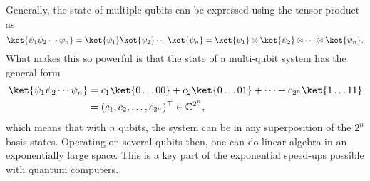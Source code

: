 Generally, the state of multiple qubits can be expressed using the tensor product as
\begin{equation}
    \ket{\psi_1 \psi_2 \cdots  \psi_n}
    = \ket{\psi_1} \ket{\psi_2} \cdots \ket{\psi_n}
    = \ket{\psi_1} \otimes \ket{\psi_2} \otimes \cdots \otimes \ket{\psi_n}
    \label{eq:tensor}.
\end{equation}
What makes this so powerful is that the state of a multi-qubit system has the general form
\begin{equation}
    \begin{aligned}
        \ket{\psi_1 \psi_2 \cdots  \psi_n}
         & = c_1 \ket{0\dots 00} + c_2 \ket{0\dots 01} + \cdots + c_{2^n} \ket{1\dots 11} \\
         & = (c_1, c_2, \dots, c_{2^n} )^\top
        \in \mathbb{C}^{2^n},
        \label{eq:superposition}
    \end{aligned}
\end{equation}
which means that with $n$ qubits, the system can be in any superposition of the $2^n$ basis states.
Operating on several qubits then, one can do linear algebra in an exponentially large space.
This is a key part of the exponential speed-ups possible with quantum computers.